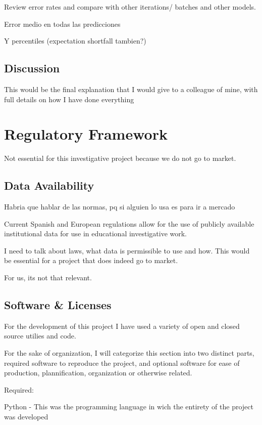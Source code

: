 \documentclass[12pt]{report} %
\begin{document}
Review error rates and compare with other iterations/ batches and other models.

Error medio en todas las predicciones

Y percentiles (expectation shortfall tambien?)

\section{Discussion} %
This would be the final explanation that I would give to a colleague of mine, with full details on how I have done everything



\chapter{Regulatory Framework}
Not essential for this investigative project because we do not go to market.

\section{Data Availability}
Habria que hablar de las normas, pq si alguien lo usa es para ir a mercado

Current Spanish and European regulations allow for the use of publicly available institutional data for use in educational investigative work.

I need to talk about laws, what data is permissible to use and how. This would be essential for a project that does indeed go to market.

For us, its not that relevant.

\section{Software \& Licenses}

For the development of this project I have used a variety of open and closed source utilies and code.

For the sake of organization, I will categorize this section into two distinct parts, required software to reproduce the project, and optional software for ease of production, plannification, organization or otherwise related.

Required:

Python - This was the programming language in wich the entirety of the project was developed \cite{python}
\end{document}
